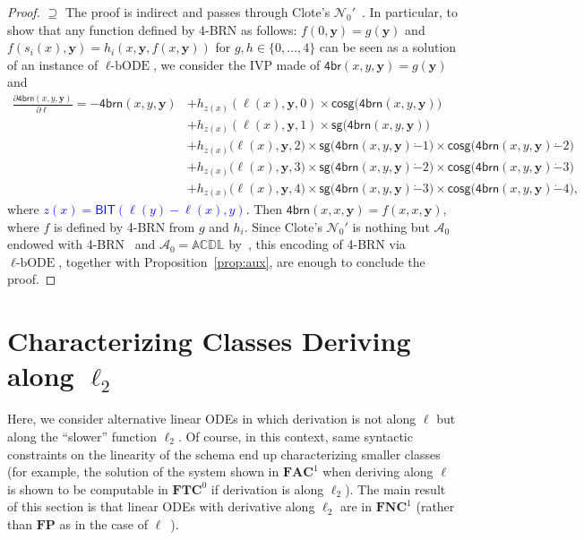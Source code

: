 \documentclass[11pt, oneside]{article}
\newcommand{\loglog}{\ell_2}
\newcommand{\ACDL}{\mathbb{ACDL}}
\newcommand{\fun}[1]{\mathsf{#1}}
\newcommand{\FP}{\mathbf{FP}}
\newcommand{\NC}{\mathbf{FNC}}
\newcommand{\AC}{\mathbf{FAC}}
\newcommand{\TC}{\mathbf{FTC}}
\newcommand{\tu}[1]{\mathbf{#1}}
\theoremstyle{definition}
\newcommand{\chODE}{\ell\text{-bODE}}
\begin{document}
{\begin{proof}
    $\supseteq$ The proof is indirect and passes through Clote's $\mathcal{N}_0'$~\cite{Clote93}. 
    In particular, to show that any function defined by 4-BRN as follows: $f(0, \tu y)=g(\tu y)$ and $f(s_i(x), \tu y)=h_i(x, \tu y, f(x, \tu y))$ for $g,h\in \{0,\dots, 4\}$ can be seen as a solution of an instance of $\chODE$, we consider the IVP made of $\fun{4br}(x,y,\tu y)=g(\tu y)$ and
    \small
    \begin{align*}
        \frac{\partial \fun{4brn}(x, y, \tu y)}{\partial \ell} = -\fun{4brn}(x, y, \tu y) &+ h_{z(x)}(\ell(x), \tu y, 0) \times \fun{cosg}\big(\fun{4brn}(x, y, \tu y)\big) \\
        & + h_{z(x)}(\ell(x), \tu y, 1) \times \fun{sg}\big(\fun{4brn}(x, y, \tu y)\big) \\
        & + h_{z(x)}\big(\ell(x), \tu y, 2\big) \times \fun{sg}\big(\fun{4brn}(x, y, \tu y)\dot{-}1\big)\times \fun{cosg}\big(\fun{4brn}(x,y,\tu y)\dot{-}2\big) \\
        &+ h_{z(x)}\big(\ell(x), \tu y, 3\big) \times   \fun{sg}\big(\fun{4brn}(x,y,\tu y) \dot{-} 2\big) \times \fun{cosg}\big(\fun{4brn}(x, y, \tu y) \dot{-} 3\big) \\
        &+ h_{z(x)}\big(\ell(x), \tu y, 4\big) \times \fun{sg}\big(\fun{4brn}(x,y,\tu y) \dot{-} 3\big) \times \fun{cosg}\big(\fun{4brn}(x, y, \tu y) \dot{-} 4\big),
    \end{align*}
    \normalsize
    where \textcolor{blue}{$z(x)=\fun{BIT}(\ell(y)-\ell(x), y)$}.
    Then $\fun{4brn}(x,x,\tu y)=f(x,x,\tu y)$, where $f$ is defined by 4-BRN from $g$ and $h_i$.
    Since Clote's $\mathcal{N}_0'$ is nothing but $\mathcal{A}_0$ endowed with 4-BRN~\cite{Clote93} and $\mathcal{A}_0=\ACDL$ by~\cite{ADK24a}, this encoding of 4-BRN via $\chODE$, together with Proposition~\ref{prop:aux}, are enough to conclude the proof.
\end{proof}


} %














\section{Characterizing Classes Deriving along $\ell_2$}\label{sec:2ell}

Here, we consider alternative linear ODEs in which derivation is not along $\ell$ but along the ``slower'' function $\loglog$. 
%
Of course, in this context, same syntactic constraints on the linearity of the schema end up characterizing smaller classes (for example, the solution of the system shown in $\AC^1$ when deriving along $\ell$ is shown to be computable in $\TC^0$ if  derivation is along $\ell_2$). 
%
The main result of this section is that linear ODEs with derivative along $\loglog$ %
are in $\NC^1$ (rather than $\FP$ as in the case of $\ell$~\cite{BournezDurand19}).
\end{document}
